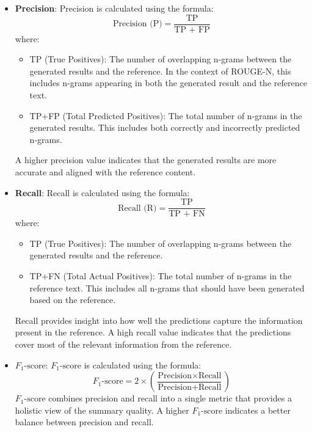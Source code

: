 \documentclass[runningheads]{llncs}
\begin{document}
\begin{itemize}
    \item \textbf{Precision}: Precision is calculated using the formula:
    \[
    \text{Precision (P)} = \frac{\text{TP}}{\text{TP + FP}}
    \]
    where:
    \begin{itemize}
        \item TP (True Positives): The number of overlapping n-grams between the generated results and the reference. In the context of ROUGE-N, this includes n-grams appearing in both the generated result and the reference text.
        \item TP+FP (Total Predicted Positives): The total number of n-grams in the generated results. This includes both correctly and incorrectly predicted n-grams.
    \end{itemize}
    A higher precision value indicates that the generated results are more accurate and aligned with the reference content.

    \item \textbf{Recall}: Recall is calculated using the formula:
    \[
    \text{Recall (R)} = \frac{\text{TP}}{\text{TP + FN}}
    \]
    where:
    \begin{itemize}
        \item TP (True Positives): The number of overlapping n-grams between the generated results and the reference.
        \item TP+FN (Total Actual Positives): The total number of n-grams in the reference text. This includes all n-grams that should have been generated based on the reference.
    \end{itemize}
    Recall provides insight into how well the predictions capture the information present in the reference. A high recall value indicates that the predictions cover most of the relevant information from the reference.

    \item \textbf{\( F_{1}\text{-score} \)}: 
    \( F_{1}\text{-score} \) is calculated using the formula:
    \[
    F_{1}\text{-score} = 2 \times \left( \frac{\text{Precision} \times \text{Recall}}{\text{Precision} + \text{Recall}} \right)
    \]
    \( F_{1}\text{-score} \) combines precision and recall into a single metric that provides a holistic view of the summary quality. A higher \( F_{1}\text{-score} \) indicates a better balance between precision and recall.
\end{itemize}
    
\end{document}
